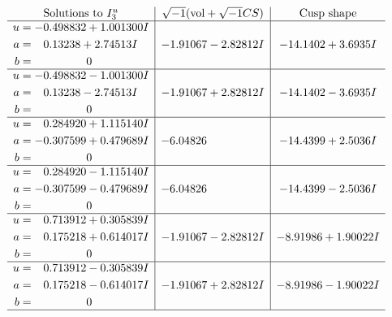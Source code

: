 \documentclass[1p]{elsarticle_modified}
\theoremstyle{definition}
\newcommand{\I}{\sqrt{-1}}
\begin{document}
$$\begin{array}{c|c|c}  
\text{Solutions to }I^u_{3}& \I (\text{vol} + \sqrt{-1}CS) & \text{Cusp shape}\\
 \hline 
\begin{aligned}
u &= -0.498832 + 1.001300 I \\
a &= \phantom{-}0.13238 + 2.74513 I \\
b &= \phantom{-0.000000 } 0\end{aligned}
 & -1.91067 - 2.82812 I & -14.1402 + 3.6935 I \\ \hline\begin{aligned}
u &= -0.498832 - 1.001300 I \\
a &= \phantom{-}0.13238 - 2.74513 I \\
b &= \phantom{-0.000000 } 0\end{aligned}
 & -1.91067 + 2.82812 I & -14.1402 - 3.6935 I \\ \hline\begin{aligned}
u &= \phantom{-}0.284920 + 1.115140 I \\
a &= -0.307599 + 0.479689 I \\
b &= \phantom{-0.000000 } 0\end{aligned}
 & -6.04826\phantom{ +0.000000I} & -14.4399 + 2.5036 I \\ \hline\begin{aligned}
u &= \phantom{-}0.284920 - 1.115140 I \\
a &= -0.307599 - 0.479689 I \\
b &= \phantom{-0.000000 } 0\end{aligned}
 & -6.04826\phantom{ +0.000000I} & -14.4399 - 2.5036 I \\ \hline\begin{aligned}
u &= \phantom{-}0.713912 + 0.305839 I \\
a &= \phantom{-}0.175218 + 0.614017 I \\
b &= \phantom{-0.000000 } 0\end{aligned}
 & -1.91067 - 2.82812 I & -8.91986 + 1.90022 I \\ \hline\begin{aligned}
u &= \phantom{-}0.713912 - 0.305839 I \\
a &= \phantom{-}0.175218 - 0.614017 I \\
b &= \phantom{-0.000000 } 0\end{aligned}
 & -1.91067 + 2.82812 I & -8.91986 - 1.90022 I\\
 \hline 
 \end{array}$$\newpage\newpage\renewcommand{\arraystretch}{1}
\end{document}
